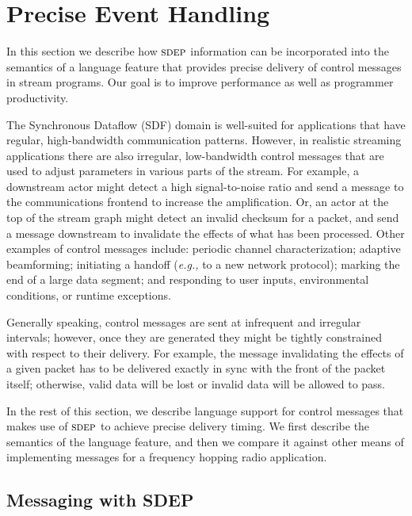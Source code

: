 \section{Precise Event Handling}
In this section we describe how $\textsc{sdep}$ information can be
incorporated into the semantics of a language feature that provides
precise delivery of control messages in stream programs.  Our goal is
to improve performance as well as programmer productivity.

The Synchronous Dataflow (SDF) domain is well-suited for applications
that have regular, high-bandwidth communication patterns.  However, in
realistic streaming applications there are also irregular,
low-bandwidth control messages that are used to adjust parameters in
various parts of the stream.  For example, a downstream actor might
detect a high signal-to-noise ratio and send a message to the
communications frontend to increase the amplification.  Or, an actor
at the top of the stream graph might detect an invalid checksum for a
packet, and send a message downstream to invalidate the effects of
what has been processed.  Other examples of control messages include:
periodic channel characterization; adaptive beamforming; initiating a
handoff ({\it e.g.,} to a new network protocol); marking the end of a
large data segment; and responding to user inputs, environmental
conditions, or runtime exceptions.

Generally speaking, control messages are sent at infrequent and
irregular intervals; however, once they are generated they might be
tightly constrained with respect to their delivery.  For example, the
message invalidating the effects of a given packet has to be delivered
exactly in sync with the front of the packet itself; otherwise, valid
data will be lost or invalid data will be allowed to pass.

In the rest of this section, we describe language support for control
messages that makes use of $\textsc{sdep}$ to achieve precise delivery timing.
We first describe the semantics of the language feature, and then we
compare it against other means of implementing messages for a
frequency hopping radio application.

\subsection{Messaging with SDEP}

